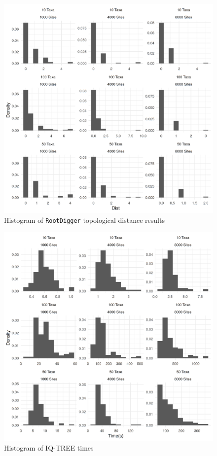 \documentclass{article}
\newcommand{\RootDiggertt}{\texttt{RootDigger}}
\begin{document}
\begin{figure}
  \begin{center}
    \includegraphics[width=.9\linewidth]{./figs/timing_plots/rd_dist_hist.png}
    \caption{Histogram of \RootDiggertt{} topological distance results
    \label{fig:rd_dist_results}}
\end{center}
\end{figure}

\begin{figure}
  \begin{center}
    \includegraphics[width=.9\linewidth]{./figs/timing_plots/iq_time_hist.png}
  \caption{Histogram of IQ-TREE times
  \label{fig:iq_time_results}}
\end{center}
\end{figure}
\end{document}
